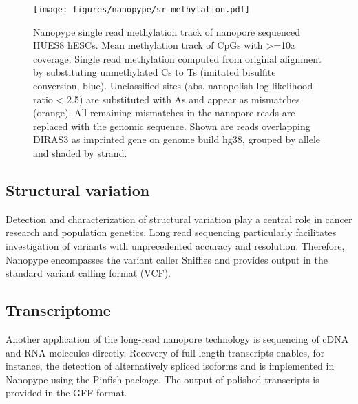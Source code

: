 \begin{figure}[h]
	\centering
	\texttt{[image: figures/nanopype/sr\_methylation.pdf]}
	\captionsetup{format=plain}
	\caption[Nanopype single read methylation track]{Nanopype single read methylation track of nanopore sequenced HUES8 hESCs. Mean methylation track of CpGs with >=10\textit{x} coverage. Single read methylation computed from original alignment by substituting unmethylated Cs to Ts (imitated bisulfite conversion, blue). Unclassified sites (abs. nanopolish log-likelihood-ratio < 2.5) are substituted with As and appear as mismatches (orange). All remaining mismatches in the nanopore reads are replaced with the genomic sequence. Shown are reads overlapping DIRAS3 as imprinted gene on genome build hg38, grouped by allele and shaded by strand.}
	\label{fig:nanopype:sr_methylation}
\end{figure}


\subsection{Structural variation}
\label{subsec:nanopype:sv}
Detection and characterization of structural variation play a central role in cancer research and population genetics. Long read sequencing particularly facilitates investigation of variants with unprecedented accuracy and resolution. Therefore, Nanopype encompasses the variant caller Sniffles \cite{Sedlazeck2018} and provides output in the standard variant calling format (VCF).

\subsection{Transcriptome}
\label{subsec:nanopype:transcriptom}
Another application of the long-read nanopore technology is sequencing of cDNA and RNA molecules directly. Recovery of full-length transcripts enables, for instance, the detection of alternatively spliced isoforms and is implemented in Nanopype using the Pinfish package. The output of polished transcripts is provided in the GFF format.

